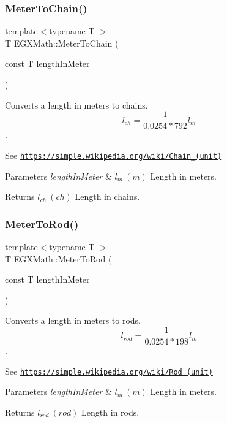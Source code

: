 \subsubsection{\texorpdfstring{Meter\+To\+Chain()}{MeterToChain()}}
{\footnotesize\ttfamily template$<$typename T $>$ \\
T E\+G\+X\+Math\+::\+Meter\+To\+Chain (\begin{DoxyParamCaption}\item[{const T}]{length\+In\+Meter }\end{DoxyParamCaption})}



Converts a length in meters to chains. \[ l_{ch}= \frac{1}{0.0254 * 792} l_{m} \]. 

See \href{https://simple.wikipedia.org/wiki/Chain_(unit)}{\tt https\+://simple.\+wikipedia.\+org/wiki/\+Chain\+\_\+(unit)} 
\begin{DoxyParams}{Parameters}
{\em length\+In\+Meter} & $ l_{m}\ (m)$ Length in meters. \\
\hline
\end{DoxyParams}
\begin{DoxyReturn}{Returns}
$ l_{ch}\ (ch)$ Length in chains. 
\end{DoxyReturn}
\mbox{\label{group___e_g_x_math-_conversions-_length_conversions-_s_i-_meter-_surveyors_ga45c89e4e6dd1d1e3f2a6c4f4a1051543}} 
\subsubsection{\texorpdfstring{Meter\+To\+Rod()}{MeterToRod()}}
{\footnotesize\ttfamily template$<$typename T $>$ \\
T E\+G\+X\+Math\+::\+Meter\+To\+Rod (\begin{DoxyParamCaption}\item[{const T}]{length\+In\+Meter }\end{DoxyParamCaption})}



Converts a length in meters to rods. \[ l_{rod}= \frac{1}{0.0254 * 198} l_{m} \]. 

See \href{https://simple.wikipedia.org/wiki/Rod_(unit)}{\tt https\+://simple.\+wikipedia.\+org/wiki/\+Rod\+\_\+(unit)} 
\begin{DoxyParams}{Parameters}
{\em length\+In\+Meter} & $ l_{m}\ (m)$ Length in meters. \\
\hline
\end{DoxyParams}
\begin{DoxyReturn}{Returns}
$ l_{rod}\ (rod)$ Length in rods. 
\end{DoxyReturn}
